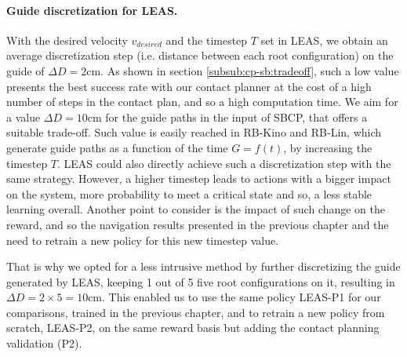 \paragraph{Guide discretization for LEAS.\label{par:cpsb:discussion_guide_discretization}}
With the desired velocity $v_{desired}$ and the timestep $T$ set in LEAS, we obtain an average discretization step (i.e. distance between each root configuration) on the guide of $\Delta D=2$cm. 
As shown in section \ref{subsub:cp-sb:tradeoff}, such a low value presents the best success rate with our contact planner at the cost of a high number of steps in the contact plan, and so a high computation time. We aim for a value $\Delta D=10$cm for the guide paths in the input of SBCP, that offers a suitable trade-off.
Such value is easily reached in RB-Kino and RB-Lin, which generate guide paths as a function of the time $G=f(t)$, by increasing the timestep $T$.
LEAS could also directly achieve such a discretization step with the same strategy.
However, a higher timestep leads to actions with a bigger impact on the system, more probability to meet a critical state and so, a less stable learning overall.
Another point to consider is the impact of such change on the reward, and so the navigation results presented in the previous chapter and the need to retrain a new policy for this new timestep value.

That is why we opted for a less intrusive method by further discretizing the guide generated by LEAS, keeping 1 out of 5 five root configurations on it, resulting in $\Delta D=2 \times 5=10$cm.
This enabled us to use the same policy LEAS-P1 for our comparisons, trained in the previous chapter, and to retrain a new policy from scratch, LEAS-P2, on the same reward basis but adding the contact planning validation (P2).


